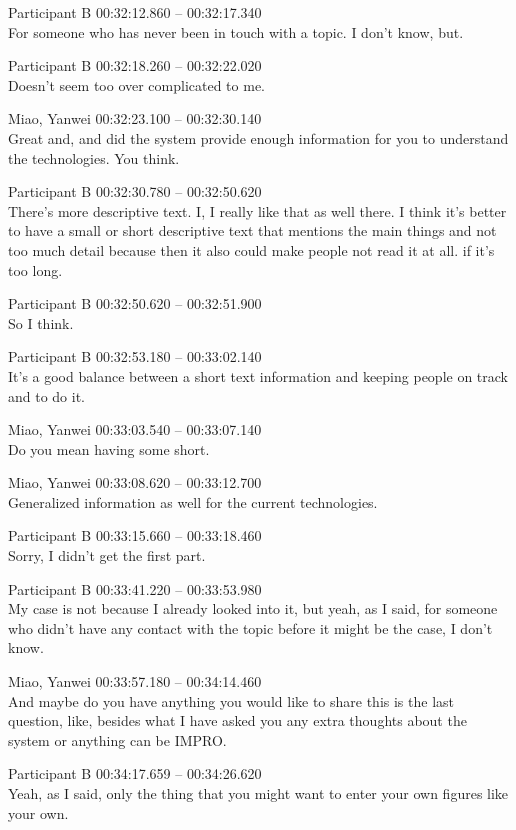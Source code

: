 {Participant B 00:32:12.860 -- 00:32:17.340 \\
For someone who has never been in touch with a topic. I don't know, but.

Participant B 00:32:18.260 -- 00:32:22.020 \\
Doesn't seem too over complicated to me.

Miao, Yanwei 00:32:23.100 -- 00:32:30.140 \\
Great and, and did the system provide enough information for you to understand the technologies. You think.

Participant B 00:32:30.780 -- 00:32:50.620 \\
There's more descriptive text. I, I really like that as well there. I think it's better to have a small or short descriptive text that mentions the main things and not too much detail because then it also could make people not read it at all. if it's too long.

Participant B 00:32:50.620 -- 00:32:51.900 \\
So I think.

Participant B 00:32:53.180 -- 00:33:02.140 \\
It's a good balance between a short text information and keeping people on track and to do it.

Miao, Yanwei 00:33:03.540 -- 00:33:07.140 \\
Do you mean having some short.

Miao, Yanwei 00:33:08.620 -- 00:33:12.700 \\
Generalized information as well for the current technologies.

Participant B 00:33:15.660 -- 00:33:18.460 \\
Sorry, I didn't get the first part.

Participant B 00:33:41.220 -- 00:33:53.980 \\
My case is not because I already looked into it, but yeah, as I said, for someone who didn't have any contact with the topic before it might be the case, I don't know.

Miao, Yanwei 00:33:57.180 -- 00:34:14.460 \\
And maybe do you have anything you would like to share this is the last question, like, besides what I have asked you any extra thoughts about the system or anything can be IMPRO.

Participant B 00:34:17.659 -- 00:34:26.620 \\
Yeah, as I said, only the thing that you might want to enter your own figures like your own.

}
